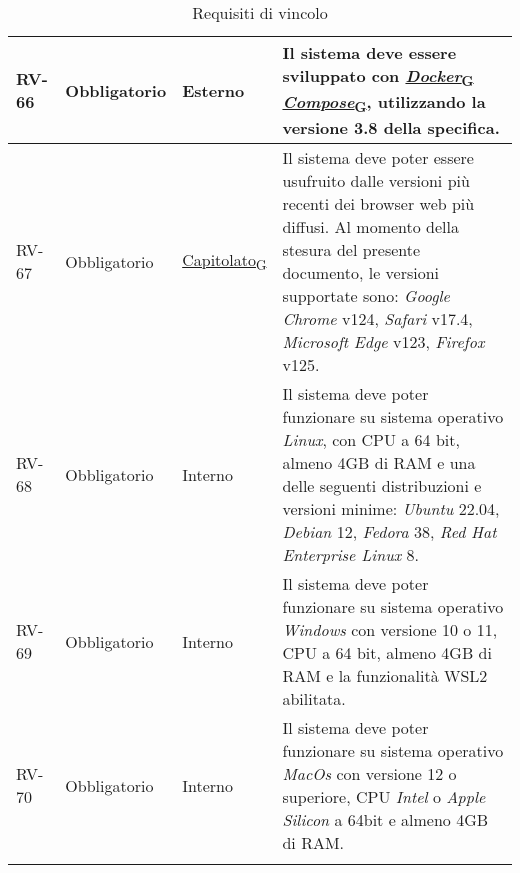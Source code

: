 \begin{longtable}{|>{\centering\arraybackslash}m{}|>{\centering\arraybackslash}m{}|>{\centering\arraybackslash}m{}|>{\centering\arraybackslash}m{}|}
	\\\hline
	RV-66           & Obbligatorio        & Esterno                                                                                                           & Il sistema deve essere sviluppato con \href{https://7last.github.io/docs/rtb/documentazione-interna/glossario\#docker-compose}{\href{https://7last.github.io/docs/rtb/documentazione-interna/glossario\#docker}{\textit{Docker}\textsubscript{G}}\textit{ Compose}\textsubscript{G}}, utilizzando la versione 3.8 della specifica.
	\\\hline
	RV-67           & Obbligatorio        & \href{https://7last.github.io/docs/rtb/documentazione-interna/glossario\#capitolato}{Capitolato\textsubscript{G}} & Il sistema deve poter essere usufruito dalle versioni più recenti dei browser web più diffusi. Al momento della stesura del presente documento, le versioni supportate sono: \textit{Google Chrome} v124, \textit{Safari} v17.4, \textit{Microsoft Edge} v123, \textit{Firefox} v125.
	\\\hline
	RV-68           & Obbligatorio        & Interno                                                                                                           & Il sistema deve poter funzionare su sistema operativo \textit{Linux}, con CPU a 64 bit, almeno 4GB di RAM e una delle seguenti distribuzioni e versioni minime: \textit{Ubuntu} 22.04, \textit{Debian} 12, \textit{Fedora} 38, \textit{Red Hat Enterprise Linux} 8.
	\\\hline
	RV-69           & Obbligatorio        & Interno                                                                                                           & Il sistema deve poter funzionare su sistema operativo \textit{Windows} con versione 10 o 11, CPU a 64 bit, almeno 4GB di RAM e la funzionalità WSL2 abilitata.
	\\\hline
	RV-70           & Obbligatorio        & Interno                                                                                                           & Il sistema deve poter funzionare su sistema operativo \textit{MacOs} con versione 12 o superiore, CPU \textit{Intel} o \textit{Apple Silicon} a 64bit e almeno 4GB di RAM.
	\\\hline
	\caption{Requisiti di vincolo}
\end{longtable}

